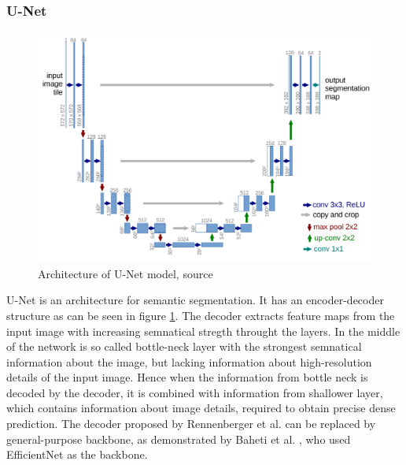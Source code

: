 \subsubsection{U-Net}
\begin{figure}
    \centering
    \includegraphics[width=\linewidth]{images/U-Net.png}
    \caption{Architecture of U-Net model, source \cite{Ronneberger2015}}
    \label{fig:unet_architecture}
\end{figure}
U-Net is an architecture for semantic segmentation. It has an encoder-decoder structure as can be seen in figure \ref{fig:unet_architecture}. The decoder extracts feature maps from the input image with increasing semnatical stregth throught the layers. In the middle of the network is so called bottle-neck layer with the strongest semnatical information about the image, but lacking information about high-resolution details of the input image. Hence when the information from bottle neck is decoded by the decoder, it is combined with information from shallower layer, which contains information about image details, required to obtain precise dense prediction.
\newline
The decoder proposed by Rennenberger et al. \cite{Ronneberger2015} can be replaced by general-purpose backbone, as demonstrated by Baheti et al. \cite{Baheti2020}, who used EfficientNet as the backbone.